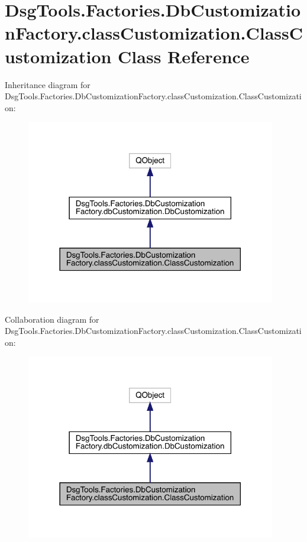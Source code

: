 \hypertarget{class_dsg_tools_1_1_factories_1_1_db_customization_factory_1_1class_customization_1_1_class_customization}{}\section{Dsg\+Tools.\+Factories.\+Db\+Customization\+Factory.\+class\+Customization.\+Class\+Customization Class Reference}
\label{class_dsg_tools_1_1_factories_1_1_db_customization_factory_1_1class_customization_1_1_class_customization}


Inheritance diagram for Dsg\+Tools.\+Factories.\+Db\+Customization\+Factory.\+class\+Customization.\+Class\+Customization\+:
\nopagebreak
\begin{figure}[H]
\begin{center}
\leavevmode
\includegraphics[width=309pt]{class_dsg_tools_1_1_factories_1_1_db_customization_factory_1_1class_customization_1_1_class_customization__inherit__graph}
\end{center}
\end{figure}


Collaboration diagram for Dsg\+Tools.\+Factories.\+Db\+Customization\+Factory.\+class\+Customization.\+Class\+Customization\+:
\nopagebreak
\begin{figure}[H]
\begin{center}
\leavevmode
\includegraphics[width=309pt]{class_dsg_tools_1_1_factories_1_1_db_customization_factory_1_1class_customization_1_1_class_customization__coll__graph}
\end{center}
\end{figure}
